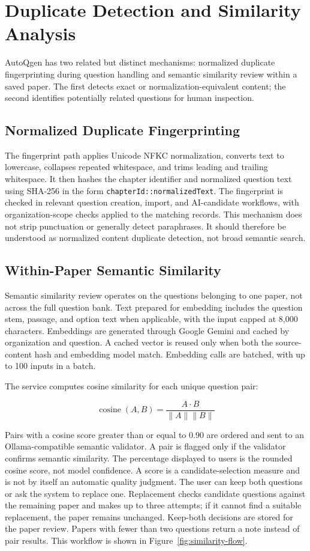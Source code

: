 \section{Duplicate Detection and Similarity Analysis}

AutoQgen has two related but distinct mechanisms: normalized duplicate fingerprinting during question handling and semantic similarity review within a saved paper. The first detects exact or normalization-equivalent content; the second identifies potentially related questions for human inspection.

\subsection{Normalized Duplicate Fingerprinting}

The fingerprint path applies Unicode NFKC normalization, converts text to lowercase, collapses repeated whitespace, and trims leading and trailing whitespace. It then hashes the chapter identifier and normalized question text using SHA-256 in the form \texttt{chapterId::normalizedText}. The fingerprint is checked in relevant question creation, import, and AI-candidate workflows, with organization-scope checks applied to the matching records. This mechanism does not strip punctuation or generally detect paraphrases. It should therefore be understood as normalized content duplicate detection, not broad semantic search.

\subsection{Within-Paper Semantic Similarity}

Semantic similarity review operates on the questions belonging to one paper, not across the full question bank. Text prepared for embedding includes the question stem, passage, and option text when applicable, with the input capped at 8,000 characters. Embeddings are generated through Google Gemini and cached by organization and question. A cached vector is reused only when both the source-content hash and embedding model match. Embedding calls are batched, with up to 100 inputs in a batch.

The service computes cosine similarity for each unique question pair:

\[
\operatorname{cosine}(A,B)
=
\frac{A \cdot B}{\|A\|\|B\|}
\]

Pairs with a cosine score greater than or equal to \(0.90\) are ordered and sent to an Ollama-compatible semantic validator. A pair is flagged only if the validator confirms semantic similarity. The percentage displayed to users is the rounded cosine score, not model confidence. A score is a candidate-selection measure and is not by itself an automatic quality judgment. The user can keep both questions or ask the system to replace one. Replacement checks candidate questions against the remaining paper and makes up to three attempts; if it cannot find a suitable replacement, the paper remains unchanged. Keep-both decisions are stored for the paper review. Papers with fewer than two questions return a note instead of pair results. This workflow is shown in Figure~\ref{fig:similarity-flow}.

